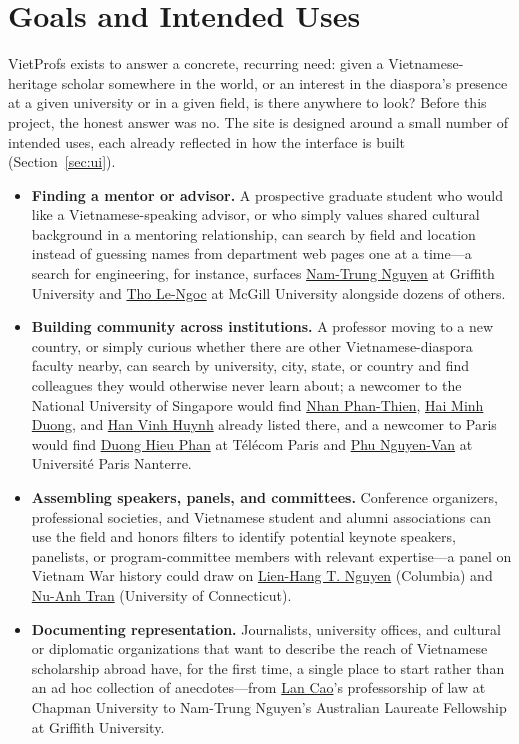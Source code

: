 \documentclass[11pt]{article}
\newcommand{\vplink}[2]{\href{https://vietprofs.roars.dev/?q=#1}{#2}}
\begin{document}
\section{Goals and Intended Uses}
\label{sec:goals}
VietProfs exists to answer a concrete, recurring need: given a Vietnamese-heritage scholar somewhere in the world, or an interest in the diaspora's presence at a given university or in a given field, is there anywhere to look?
Before this project, the honest answer was no.
The site is designed around a small number of intended uses, each already reflected in how the interface is built (Section~\ref{sec:ui}).

\begin{itemize}
\item \textbf{Finding a mentor or advisor.} A prospective graduate student who would like a Vietnamese-speaking advisor, or who simply values shared cultural background in a mentoring relationship, can search by field and location instead of guessing names from department web pages one at a time---a search for engineering, for instance, surfaces \vplink{Nam-Trung+Nguyen}{Nam-Trung Nguyen} at Griffith University and \vplink{Tho+Le-Ngoc}{Tho Le-Ngoc} at McGill University alongside dozens of others.
\item \textbf{Building community across institutions.} A professor moving to a new country, or simply curious whether there are other Vietnamese-diaspora faculty nearby, can search by university, city, state, or country and find colleagues they would otherwise never learn about; a newcomer to the National University of Singapore would find \vplink{Nhan+Phan-Thien}{Nhan Phan-Thien}, \vplink{Hai+Minh+Duong}{Hai Minh Duong}, and \vplink{Han+Vinh+Huynh}{Han Vinh Huynh} already listed there, and a newcomer to Paris would find \vplink{Duong+Hieu+Phan}{Duong Hieu Phan} at T\'{e}l\'{e}com Paris and \vplink{Phu+Nguyen-Van}{Phu Nguyen-Van} at Universit\'{e} Paris Nanterre.
\item \textbf{Assembling speakers, panels, and committees.} Conference organizers, professional societies, and Vietnamese student and alumni associations can use the field and honors filters to identify potential keynote speakers, panelists, or program-committee members with relevant expertise---a panel on Vietnam War history could draw on \vplink{Lien-Hang+T.+Nguyen}{Lien-Hang T. Nguyen} (Columbia) and \vplink{Nu-Anh+Tran}{Nu-Anh Tran} (University of Connecticut).
\item \textbf{Documenting representation.} Journalists, university offices, and cultural or diplomatic organizations that want to describe the reach of Vietnamese scholarship abroad have, for the first time, a single place to start rather than an ad hoc collection of anecdotes---from \vplink{Lan+Cao}{Lan Cao}'s professorship of law at Chapman University to Nam-Trung Nguyen's Australian Laureate Fellowship at Griffith University.

\end{itemize}
\end{document}

